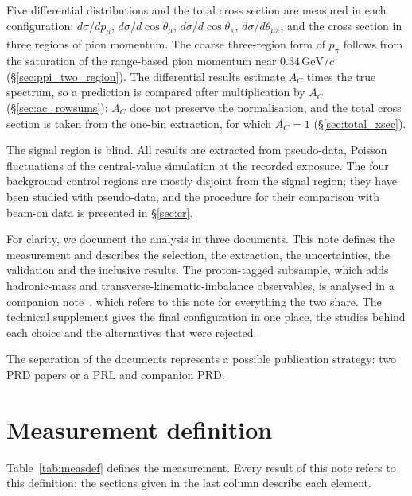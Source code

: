 \documentclass[11pt,a4paper]{article}
\newcommand{\GeVc}{\,\text{GeV}\!/c}
\begin{document}
Five differential distributions and the total cross section are measured in each configuration: $d\sigma/dp_\mu$, $d\sigma/d\cos\theta_\mu$, $d\sigma/d\cos\theta_\pi$,
$d\sigma/d\theta_{\mu\pi}$, and the cross section in three regions of pion momentum. The coarse
three-region form of $p_\pi$ follows from the saturation of the
range-based pion momentum near $0.34\GeVc$ (\S\ref{sec:ppi_two_region}). The differential results
estimate $A_C$ times the true spectrum, so a prediction is compared after multiplication by $A_C$
(\S\ref{sec:ac_rowsums}); $A_C$ does not preserve the normalisation, and the total cross section is
taken from the one-bin extraction, for which $A_C=1$ (\S\ref{sec:total_xsec}).

The signal region is blind. All results are extracted from pseudo-data, Poisson fluctuations of the
central-value simulation at the recorded exposure. The four background control regions are mostly disjoint from the
signal region; they have been studied with pseudo-data, and the procedure for their comparison with
beam-on data is presented in \S\ref{sec:cr}.

For clarity, we document the analysis in three documents. This note defines the
measurement and describes the selection, the extraction, the uncertainties, the validation and the
inclusive results. The proton-tagged subsample, which adds hadronic-mass and
transverse-kinematic-imbalance observables, is analysed in a companion note~\cite{pt_note}, which
refers to this note for everything the two share. The technical supplement gives the final
configuration in one place, the studies behind each choice and the alternatives that were rejected.

The separation of the documents represents a possible publication strategy: two PRD papers or a PRL and companion PRD. 



\section{Measurement definition}
\label{sec:measdef}

Table~\ref{tab:measdef} defines the measurement. Every result of this note refers to this definition;
the sections given in the last column describe each element.
\end{document}
